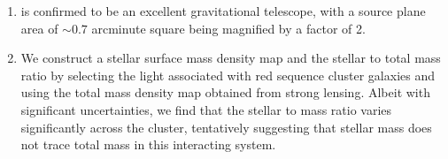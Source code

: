 \begin{enumerate}
\item \cler is confirmed to be an excellent gravitational telescope, with a source plane area of $\sim0.7$ arcminute square being 
  magnified by a factor of 2.

\item We construct a stellar surface mass density map and the stellar to total mass ratio by selecting the light associated with red sequence cluster galaxies and using the total mass density map obtained from strong lensing. Albeit with significant uncertainties, we find that the stellar to mass ratio varies significantly across the cluster, tentatively suggesting that stellar mass does not trace total mass in this interacting system.

\end{enumerate}



\begin{landscape}

\end{landscape}


